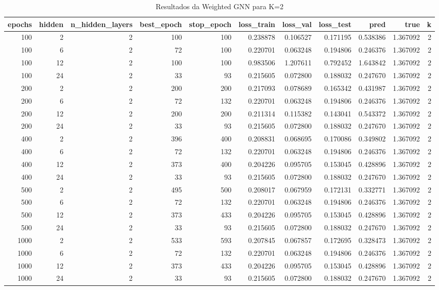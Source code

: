 \begin{table}
\caption{Resultados da Weighted GNN para K=2}
\label{tab:weighted_gnn_results_k2}
\begin{tabular}{rrrrrrrrrrr}
\toprule
epochs & hidden & n\_hidden\_layers & best\_epoch & stop\_epoch & loss\_train & loss\_val & loss\_test & pred & true & k \\
\midrule
100 & 2 & 2 & 100 & 100 & 0.238878 & 0.106527 & 0.171195 & 0.538386 & 1.367092 & 2 \\
100 & 6 & 2 & 72 & 100 & 0.220701 & 0.063248 & 0.194806 & 0.246376 & 1.367092 & 2 \\
100 & 12 & 2 & 100 & 100 & 0.983506 & 1.207611 & 0.792452 & 1.643842 & 1.367092 & 2 \\
100 & 24 & 2 & 33 & 93 & 0.215605 & 0.072800 & 0.188032 & 0.247670 & 1.367092 & 2 \\
200 & 2 & 2 & 200 & 200 & 0.217093 & 0.078689 & 0.165342 & 0.431987 & 1.367092 & 2 \\
200 & 6 & 2 & 72 & 132 & 0.220701 & 0.063248 & 0.194806 & 0.246376 & 1.367092 & 2 \\
200 & 12 & 2 & 200 & 200 & 0.211314 & 0.115382 & 0.143041 & 0.543372 & 1.367092 & 2 \\
200 & 24 & 2 & 33 & 93 & 0.215605 & 0.072800 & 0.188032 & 0.247670 & 1.367092 & 2 \\
400 & 2 & 2 & 396 & 400 & 0.208831 & 0.068695 & 0.170086 & 0.349802 & 1.367092 & 2 \\
400 & 6 & 2 & 72 & 132 & 0.220701 & 0.063248 & 0.194806 & 0.246376 & 1.367092 & 2 \\
400 & 12 & 2 & 373 & 400 & 0.204226 & 0.095705 & 0.153045 & 0.428896 & 1.367092 & 2 \\
400 & 24 & 2 & 33 & 93 & 0.215605 & 0.072800 & 0.188032 & 0.247670 & 1.367092 & 2 \\
500 & 2 & 2 & 495 & 500 & 0.208017 & 0.067959 & 0.172131 & 0.332771 & 1.367092 & 2 \\
500 & 6 & 2 & 72 & 132 & 0.220701 & 0.063248 & 0.194806 & 0.246376 & 1.367092 & 2 \\
500 & 12 & 2 & 373 & 433 & 0.204226 & 0.095705 & 0.153045 & 0.428896 & 1.367092 & 2 \\
500 & 24 & 2 & 33 & 93 & 0.215605 & 0.072800 & 0.188032 & 0.247670 & 1.367092 & 2 \\
1000 & 2 & 2 & 533 & 593 & 0.207845 & 0.067857 & 0.172695 & 0.328473 & 1.367092 & 2 \\
1000 & 6 & 2 & 72 & 132 & 0.220701 & 0.063248 & 0.194806 & 0.246376 & 1.367092 & 2 \\
1000 & 12 & 2 & 373 & 433 & 0.204226 & 0.095705 & 0.153045 & 0.428896 & 1.367092 & 2 \\
1000 & 24 & 2 & 33 & 93 & 0.215605 & 0.072800 & 0.188032 & 0.247670 & 1.367092 & 2 \\
\bottomrule
\end{tabular}
\end{table}
